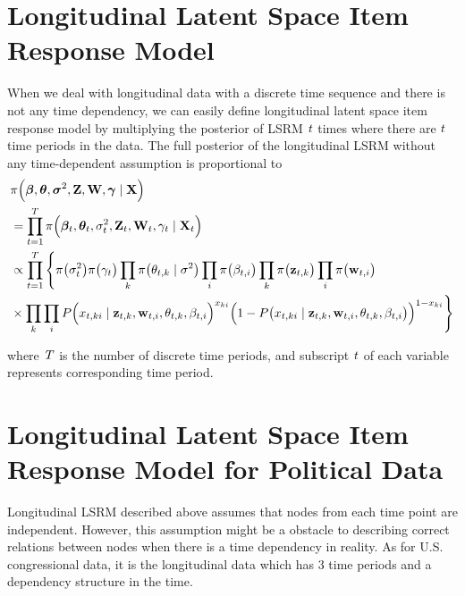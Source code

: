 \documentclass[a4paper, 11pt]{report}
\begin{document}
\section{Longitudinal Latent Space Item Response Model}\label{llsrm}
When we deal with longitudinal data with a discrete time sequence and there is not any time dependency, we can easily define longitudinal latent space item response model by multiplying the posterior of LSRM $\it{t}$ times where there are $\it{t}$ time periods in the data. The full posterior of the longitudinal LSRM without any time-dependent assumption is proportional to 
\begin{equation}
\label{longitudinal}
\begin{split}
&\pi\Big(\boldsymbol\beta, \boldsymbol\theta, \boldsymbol\sigma^2, {\bf Z}, {\bf W}, \boldsymbol\gamma \mid {\bf X}\Big)\\
&= \prod_{t=1}^T \pi\Big(\boldsymbol\beta_t, \boldsymbol\theta_t, \sigma_t^2, {\bf Z}_t, {\bf W}_t, \gamma_t \mid {\bf X}_t\Big)\\ 
&\propto \prod_{t=1}^T \Bigg\{\pi\big(\sigma_t^2\big) \pi\big(\gamma_t\big) \prod_{k}\pi\big(\theta_{t,k} \mid \sigma^2\big) \prod_{i}\pi\big(\beta_{t,i}\big)
\prod_{k}\pi\big({\bf z}_{t,k}\big) \prod_{i}\pi\big({\bf w}_{t,i}\big)\\
&\times \prod_k \prod_i P\Big(x_{t,ki} \mid {\bf z}_{t,k}, {\bf w}_{t,i}, \theta_{t,k}, \beta_{t,i}\Big)^{x_{ki}}\Big(1-P\big(x_{t,ki} \mid {\bf z}_{t,k}, {\bf w}_{t,i}, \theta_{t,k}, \beta_{t,i}\big)\Big)^{1-x_{ki}}\Bigg\}
\end{split}
\end{equation}

where $\it{T}$ is the number of discrete time periods, and subscript $\it{t}$ of each variable represents corresponding time period.

\section{Longitudinal Latent Space Item Response Model for Political Data}

\quad Longitudinal LSRM described above assumes that nodes from each time point are independent. However, this assumption might be a obstacle to describing correct relations between nodes when there is a time dependency in reality. As for U.S. congressional data, it is the longitudinal data which has 3 time periods and a dependency structure in the time.
\end{document}
